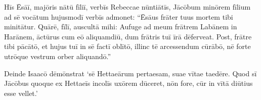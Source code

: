 \Versus Hīs Ēsāī, majōris nātū fīliī, verbīs Rebeccae nūntiātīs, Jācōbum minōrem fīlium ad sē vocātum hujusmodī verbīs admonet: ``Ēsāus frāter tuus mortem tibi minitātur.
\Versus Quārē, fīlī, auscultā mihi: Aufuge ad meum frātrem Labānem in Harānem,
\Versus āctūrus cum eō aliquamdiū, dum frātris tuī īrā dēferveat.
\Versus Post, frātre tibi pācātō, et hujus tuī in sē factī oblītō, illinc tē arcessendum cūrābō, nē forte utrōque vestrum orber aliquandō.''

\Versus Deinde Isaacō dēmōnstrat `sē Hettaeārum pertaesam, suae vītae taedēre. Quod sī Jācōbus quoque ex Hettaeīs incolīs uxōrem dūceret, nōn fore, cūr in vītā diūtius esse vellet.'
